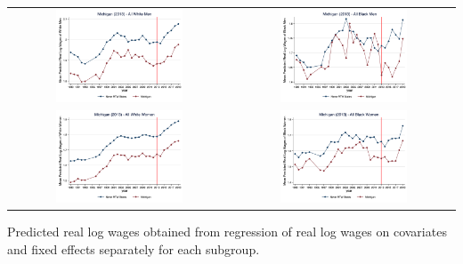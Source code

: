 \documentclass[11pt]{article}
\begin{document}
{\pagebreak
\begin{landscape}
\begin{table}[h!]
    \centering
    \label{fig:pta_mi}
    \begin{tabular}{c c}
          \includegraphics[width = 0.6\textwidth, keepaspectratio]{figures/pta/fin_wm_mi.png} & \includegraphics[width = 0.6\textwidth, keepaspectratio]{figures/pta/fin_bm_mi.png} \\
          \includegraphics[width = 0.6\textwidth, keepaspectratio]{figures/pta/fin_wf_mi.png} & \includegraphics[width = 0.6\textwidth, keepaspectratio]{figures/pta/fin_bf_mi.png}
    \end{tabular}
\end{table}
\footnotesize{Predicted real log wages obtained from regression of real log wages on covariates and fixed effects separately for each subgroup.}
\end{landscape}

}
\end{document}
